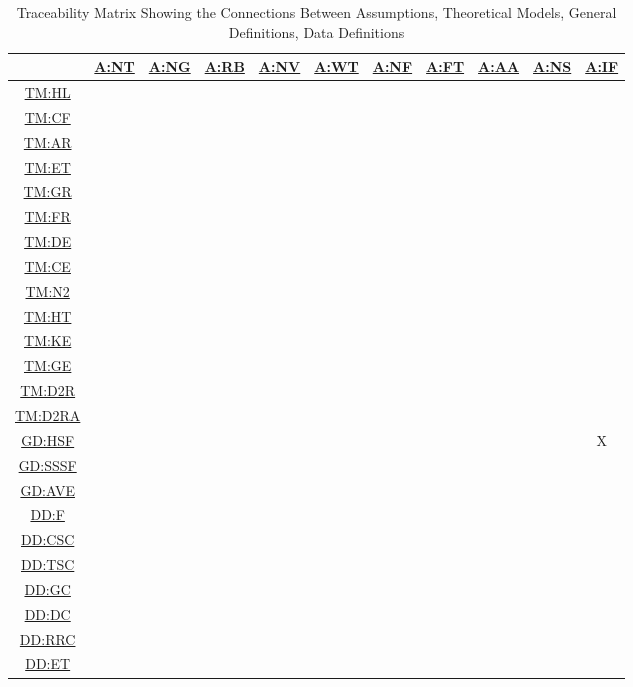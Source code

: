 \documentclass[12pt]{article}
\newcommand{\hpref}[1]{\hyperref[#1]{#1}}
\begin{document}
\begin{table}[H]
\centering
\begin{tabular}{|c|c|c|c|c|c|c|c|c|c|c|}
\hline
	& \hpref{A:NT}& \hpref{A:NG}& \hpref{A:RB}& \hpref{A:NV}& \hpref{A:WT}& \hpref{A:NF}& \hpref{A:FT}& \hpref{A:AA}& \hpref{A:NS}& \hpref{A:IF}\\
\hline
\hpref{TM:HL}        & & & & & & & & & & \\ \hline
\hpref{TM:CF}        & & & & & & & & & & \\ \hline
\hpref{TM:AR}        & & & & & & & & & & \\ \hline
\hpref{TM:ET}        & & & & & & & & & & \\ \hline
\hpref{TM:GR}        & & & & & & & & & & \\ \hline
\hpref{TM:FR}        & & & & & & & & & & \\ \hline
\hpref{TM:DE}        & & & & & & & & & & \\ \hline
\hpref{TM:CE}        & & & & & & & & & & \\ \hline
\hpref{TM:N2}        & & & & & & & & & & \\ \hline
\hpref{TM:HT}        & & & & & & & & & & \\ \hline
\hpref{TM:KE}        & & & & & & & & & & \\ \hline
\hpref{TM:GE}        & & & & & & & & & & \\ \hline
\hpref{TM:D2R}       & & & & & & & & & & \\ \hline
\hpref{TM:D2RA}      & & & & & & & & & & \\ \hline
\hpref{GD:HSF}       & & & & & & & & & &X \\ \hline
\hpref{GD:SSSF}      & & & & & & & & & & \\ \hline
\hpref{GD:AVE}       & & & & & & & & & & \\ \hline
\hpref{DD:F}         & & & & & & & & & & \\ \hline
\hpref{DD:CSC}       & & & & & & & & & & \\ \hline
\hpref{DD:TSC}       & & & & & & & & & & \\ \hline
\hpref{DD:GC}        & & & & & & & & & & \\ \hline
\hpref{DD:DC}        & & & & & & & & & & \\ \hline
\hpref{DD:RRC}       & & & & & & & & & & \\ \hline
\hpref{DD:ET}        & & & & & & & & & & \\ \hline
\end{tabular}
\caption{Traceability Matrix Showing the Connections Between Assumptions, Theoretical Models, General Definitions, Data Definitions}
\label{Table:trace_Assumptions_TM}
\end{table}
\end{document}
